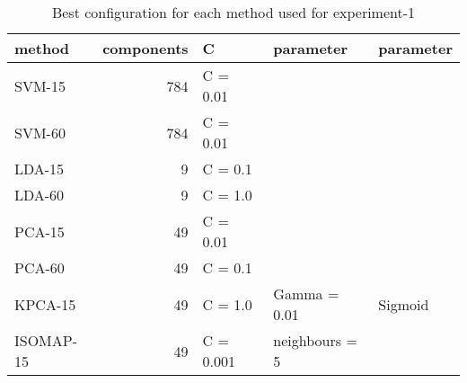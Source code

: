 \begin{table}[htb!]   
    \centering
    \begin{tabular}{lrlll}
        \toprule
        method & components & C & parameter & parameter\\
        \midrule
        SVM-15 & 784 & C = 0.01 &  \\
        SVM-60 & 784 & C = 0.01 &  \\
        LDA-15 & 9 & C = 0.1 &  \\
        LDA-60 & 9 & C = 1.0 &  \\
        PCA-15 & 49 & C = 0.01 &  \\
        PCA-60 & 49 & C = 0.1 &   \\
        KPCA-15 & 49 & C = 1.0 & Gamma = 0.01 & Sigmoid \\
        ISOMAP-15 & 49 & C = 0.001 & neighbours = 5 \\
        \bottomrule
    \end{tabular}
    \caption{Best configuration for each method used for experiment-1}
    \label{tab:best-configuration}
\end{table}